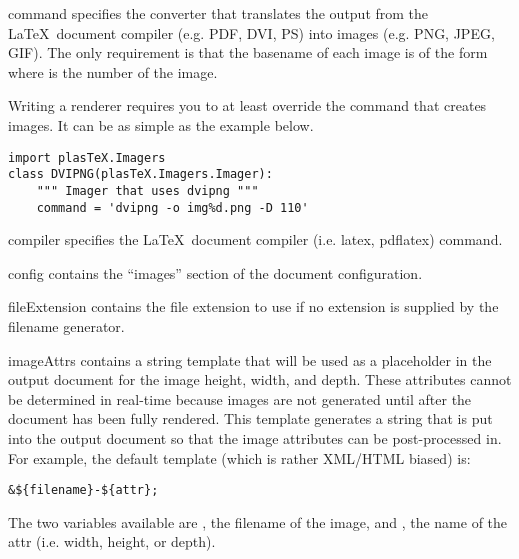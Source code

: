 \begin{memberdesc}[Imager]{command}
specifies the converter that translates the output from the \LaTeX\
document compiler (e.g. PDF, DVI, PS) into images (e.g. PNG, JPEG, GIF).
The only requirement is that the basename of each image is of the
form \file{img\%d} where \file{\%d} is the number of the image.


Writing a renderer requires you to at least override the command that
creates images.  It can be as simple as the example below.
\begin{verbatim}
import plasTeX.Imagers
class DVIPNG(plasTeX.Imagers.Imager):
    """ Imager that uses dvipng """
    command = 'dvipng -o img%d.png -D 110'
\end{verbatim}
\end{memberdesc}

\begin{memberdesc}[Imager]{compiler}
specifies the \LaTeX\ document compiler (i.e. latex, pdflatex) command.

\end{memberdesc}

\begin{memberdesc}[Imager]{config}
contains the ``images'' section of the document configuration.
\end{memberdesc}

\begin{memberdesc}[Imager]{fileExtension}
contains the file extension to use if no extension is supplied by the
filename generator.
\end{memberdesc}

\begin{memberdesc}[Imager]{imageAttrs}
contains a string template that will be used as a placeholder in the output
document for the image height, width, and depth.  These attributes cannot
be determined in real-time because images are not generated until after
the document has been fully rendered.  This template generates a string
that is put into the output document so that the image attributes can
be post-processed in.  For example, the default template (which is rather
XML/HTML biased) is:
\begin{verbatim}
&${filename}-${attr};
\end{verbatim}
The two variables available are , the filename of the
image, and \var{attr}, the name of the attr (i.e. width, height, or depth).
\end{memberdesc}

